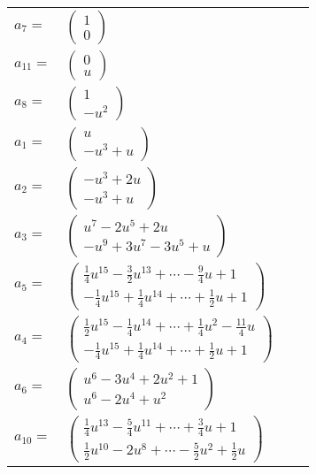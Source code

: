 \documentclass[1p]{elsarticle_modified}
\theoremstyle{definition}
\begin{document}
\begin{tabular}{m{7pt} m{180pt} m{7pt} m{180pt} }
\flushright $a_{7}=$&$\begin{pmatrix}1\\0\end{pmatrix}$ \\
\flushright $a_{11}=$&$\begin{pmatrix}0\\u\end{pmatrix}$ \\
\flushright $a_{8}=$&$\begin{pmatrix}1\\- u^2\end{pmatrix}$ \\
\flushright $a_{1}=$&$\begin{pmatrix}u\\- u^3+u\end{pmatrix}$ \\
\flushright $a_{2}=$&$\begin{pmatrix}- u^3+2 u\\- u^3+u\end{pmatrix}$ \\
\flushright $a_{3}=$&$\begin{pmatrix}u^7-2 u^5+2 u\\- u^9+3 u^7-3 u^5+u\end{pmatrix}$ \\
\flushright $a_{5}=$&$\begin{pmatrix}\frac{1}{4} u^{15}-\frac{3}{2} u^{13}+\cdots-\frac{9}{4} u+1\\-\frac{1}{4} u^{15}+\frac{1}{4} u^{14}+\cdots+\frac{1}{2} u+1\end{pmatrix}$ \\
\flushright $a_{4}=$&$\begin{pmatrix}\frac{1}{2} u^{15}-\frac{1}{4} u^{14}+\cdots+\frac{1}{4} u^2-\frac{11}{4} u\\-\frac{1}{4} u^{15}+\frac{1}{4} u^{14}+\cdots+\frac{1}{2} u+1\end{pmatrix}$ \\
\flushright $a_{6}=$&$\begin{pmatrix}u^6-3 u^4+2 u^2+1\\u^6-2 u^4+u^2\end{pmatrix}$ \\
\flushright $a_{10}=$&$\begin{pmatrix}\frac{1}{4} u^{13}-\frac{5}{4} u^{11}+\cdots+\frac{3}{4} u+1\\\frac{1}{2} u^{10}-2 u^8+\cdots-\frac{5}{2} u^2+\frac{1}{2} u\end{pmatrix}$ \\

\end{tabular}
\end{document}
